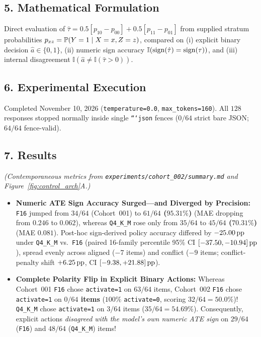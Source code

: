 \subsection*{5. Mathematical Formulation}
Direct evaluation of $\hat{\tau} = 0.5[p_{10} - p_{00}] + 0.5[p_{11} - p_{01}]$ from supplied stratum probabilities $p_{xz} = \mathbb{P}(Y=1\mid X=x, Z=z)$, compared on (i) explicit binary decision $\hat{a} \in \{0,1\}$, (ii) numeric sign accuracy $\mathbb{I}(\operatorname{sign}(\hat{\tau}) = \operatorname{sign}(\tau))$, and (iii) internal disagreement $\mathbb{I}(\hat{a} \neq \mathbb{I}(\hat{\tau} > 0))$.

\subsection*{6. Experimental Execution}
Completed November 10, 2026 (\texttt{temperature=0.0}, \texttt{max\_tokens=160}). All $128$ responses stopped normally inside single \texttt{```json} fences ($0/64$ strict bare JSON; $64/64$ fence-valid).

\subsection*{7. Results}
\emph{(Contemporaneous metrics from \texttt{experiments/cohort\_002/summary.md} and Figure~\ref{fig:control_arch}A.)}
\begin{itemize}
  \item \textbf{Numeric ATE Sign Accuracy Surged---and Diverged by Precision:} \texttt{F16} jumped from $34/64$ (Cohort~001) to \textbf{$61/64$ ($95.31\%$)} (MAE dropping from $0.246$ to $0.062$), whereas \texttt{Q4\_K\_M} rose only from $35/64$ to \textbf{$45/64$ ($70.31\%$)} (MAE $0.081$). Post-hoc sign-derived policy accuracy differed by \textbf{$-25.00\,\mathrm{pp}$} under \texttt{Q4\_K\_M} vs.\ \texttt{F16} (paired 16-family percentile 95\% CI $[-37.50, -10.94]\,\mathrm{pp}$), spread evenly across aligned ($-7$ items) and conflict ($-9$ items; conflict-penalty shift $+6.25\,\mathrm{pp}$, CI $[-9.38, +21.88]\,\mathrm{pp}$).
  \item \textbf{Complete Polarity Flip in Explicit Binary Actions:} Whereas Cohort~001 \texttt{F16} chose \texttt{activate=1} on $63/64$ items, Cohort~002 \texttt{F16} chose \texttt{activate=1} on \textbf{$0/64$ items} ($100\%$ \texttt{activate=0}, scoring $32/64 = 50.0\%$)! \texttt{Q4\_K\_M} chose \texttt{activate=1} on $3/64$ items ($35/64 = 54.69\%$). Consequently, explicit actions \emph{disagreed with the model's own numeric ATE sign} on $29/64$ (\texttt{F16}) and $48/64$ (\texttt{Q4\_K\_M}) items!
\end{itemize}

